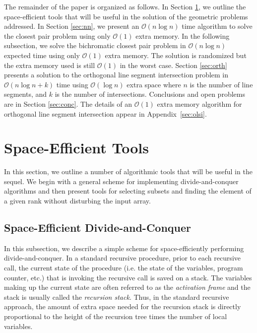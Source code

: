 \documentclass{elsart}
\newcommand{\Oh}[1]{\ensuremath{\mathcal{O}(#1)}}
\begin{document}
The remainder of the paper is organized as follows. In Section
\ref{sec:tools}, we outline the space-efficient tools that will be
useful in the solution of the geometric problems addressed. In Section
\ref{sec:nn}, we present an \Oh{n \log n} time algorithm to solve the
closest pair problem using only \Oh{1} extra memory. In the following
subsection, we solve the bichromatic closest pair problem in \Oh{n
\log n} expected time using only \Oh{1} extra memory. The solution is
randomized but the extra memory used is still \Oh{1} in the worst
case.  Section \ref{sec:orth} presents a solution to the orthogonal
line segment intersection problem in \Oh{n\log n + k} time using
\Oh{\log n} extra space where $n$ is the number of line segments, and
$k$ is the number of intersections.  Conclusions and open problems are
in Section \ref{sec:conc}.  The details of an \Oh{1} extra memory
algorithm for orthogonal line segment intersection appear in
Appendix~\ref{sec:olsi}.


%
%



\section{Space-Efficient Tools} \label{sec:tools}

In this section, we outline a number of algorithmic tools that will be
useful in the sequel.  We begin with a general scheme for implementing
divide-and-conquer algorithms and then present tools for selecting
subsets and finding the element of a given rank without disturbing the
input array.

\subsection{Space-Efficient Divide-and-Conquer}\label{sec:dc}

In this subsection, we describe a simple scheme for space-efficiently
performing divide-and-conquer. In a standard recursive procedure,
prior to each recursive call, the current state of the procedure (i.e.
the state of the variables, program counter, etc.)  that is invoking
the recursive call is saved on a stack.  The variables making up the
current state are often referred to as the {\em activation frame} and
the stack is usually called the {\em recursion stack}. 
Thus, in the standard
recursive approach, the amount of extra space needed for the recursion
stack is directly proportional to the height of the recursion tree
times the
number of local variables.
\end{document}
